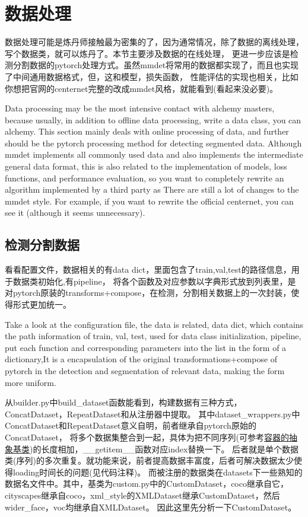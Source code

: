 \documentclass[UTF8]{ctexart}
\begin{document}
\section{数据处理}
\label{sec:detail}
数据处理可能是炼丹师接触最为密集的了，因为通常情况，除了数据的离线处理，写个数据类，就可以炼丹了。本节主要涉及数据的在线处理，
更进一步应该是检测分割数据的pytorch处理方式。虽然mmdet将常用的数据都实现了，而且也实现了中间通用数据格式，但，这和模型，损失函数，
性能评估的实现也相关，比如你想把官网的centernet完整的改成mmdet风格，就能看到(看起来没必要)。

Data processing may be the most intensive contact with alchemy masters, because usually, in addition to offline
data processing, write a data class, you can alchemy. This section mainly deals with online processing of data, 
and further should be the pytorch processing method for detecting segmented data. Although mmdet implements all 
commonly used data and also implements the intermediate general data format, this is also related to the implementation 
of models, loss functions, and performance evaluation, so you want to completely rewrite an algorithm implemented by a 
third party as There are still a lot of changes to the mmdet style. For example, if you want to rewrite the official centernet, 
you can see it (although it seems unnecessary).

\subsection{检测分割数据}
看看配置文件，数据相关的有data dict，里面包含了train,val,test的路径信息，用于数据类初始化,有pipeline，
将各个函数及对应参数以字典形式放到列表里，是对pytorch原装的transforms+compose，在检测，分割相关数据上的一次封装，使得形式更加统一。

Take a look at the configuration file, the data is related, data dict, which contains the path information of train, 
val, test, used for data class initialization, pipeline, put each function and corresponding parameters into the list 
in the form of a dictionary,It is a encapsulation of the original transformations+compose of pytorch in the detection 
and segmentation of relevant data, making the form more uniform.

从builder.py中build\_dataset函数能看到，构建数据有三种方式，ConcatDataset，RepeatDataset和从注册器中提取。
其中dataset\_wrappers.py中ConcatDataset和RepeatDataset意义自明，前者继承自pytorch原始的ConcatDataset，
将多个数据集整合到一起，具体为把不同序列(可参考\href{https://docs.python.org/zh-cn/3/library/collections.abc.html}
{容器的抽象基类})的长度相加，\_\_getitem\_\_函数对应index替换一下。
后者就是单个数据类(序列)的多次重复。就功能来说，前者提高数据丰富度，后者可解决数据太少使得loading时间长的问题(见代码注释)。
而被注册的数据类在datasets下一些熟知的数据名文件中。其中，基类为custom.py中的CustomDataset，coco继承自它，
cityscapes继承自coco，xml\_style的XMLDataset继承CustomDataset，然后wider\_face，voc均继承自XMLDataset。
因此这里先分析一下CustomDataset。
\end{document}
